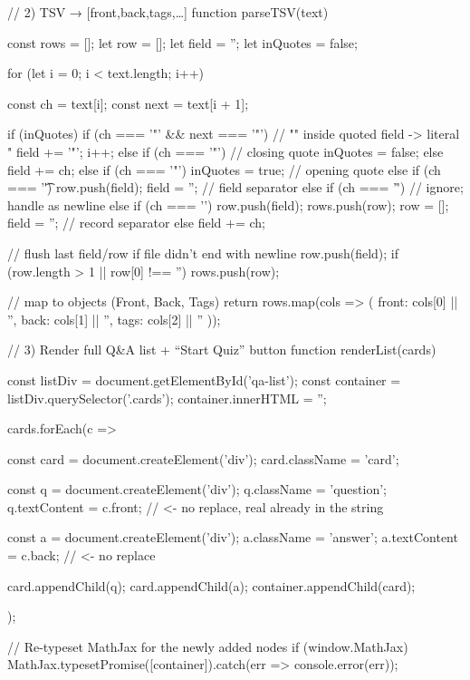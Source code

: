 \documentclass{tstextbook}
\begin{document}
    // 2) TSV → [{front,back,tags},…]
    function parseTSV(text) {
  const rows = [];
  let row = [];
  let field = '';
  let inQuotes = false;

  for (let i = 0; i < text.length; i++) {
    const ch = text[i];
    const next = text[i + 1];

    if (inQuotes) {
      if (ch === '"' && next === '"') {
        // "" inside quoted field -> literal "
        field += '"';
        i++;
      } else if (ch === '"') {
        // closing quote
        inQuotes = false;
      } else {
        field += ch;
      }
    } else {
      if (ch === '"') {
        inQuotes = true;                // opening quote
      } else if (ch === '\t') {
        row.push(field); field = '';    // field separator
      } else if (ch === '\r') {
        // ignore; handle \n as newline
      } else if (ch === '\n') {
        row.push(field); rows.push(row);
        row = []; field = '';           // record separator
      } else {
        field += ch;
      }
    }
  }
  // flush last field/row if file didn't end with newline
  row.push(field);
  if (row.length > 1 || row[0] !== '') rows.push(row);

  // map to objects (Front, Back, Tags)
  return rows.map(cols => ({
    front: cols[0] || '',
    back:  cols[1] || '',
    tags:  cols[2] || ''
  }));
}
// 3) Render full Q&A list + “Start Quiz” button
function renderList(cards) {
  const listDiv = document.getElementById('qa-list');
  const container = listDiv.querySelector('.cards');
  container.innerHTML = '';

  cards.forEach(c => {
    const card = document.createElement('div');
    card.className = 'card';

    const q = document.createElement('div');
    q.className = 'question';
    q.textContent = c.front;   // <- no replace, real \n already in the string

    const a = document.createElement('div');
    a.className = 'answer';
    a.textContent = c.back;    // <- no replace

    card.appendChild(q);
    card.appendChild(a);
    container.appendChild(card);
  });

  // Re-typeset MathJax for the newly added nodes
  if (window.MathJax) {
    MathJax.typesetPromise([container]).catch(err => console.error(err));
  }
}
\end{document}
